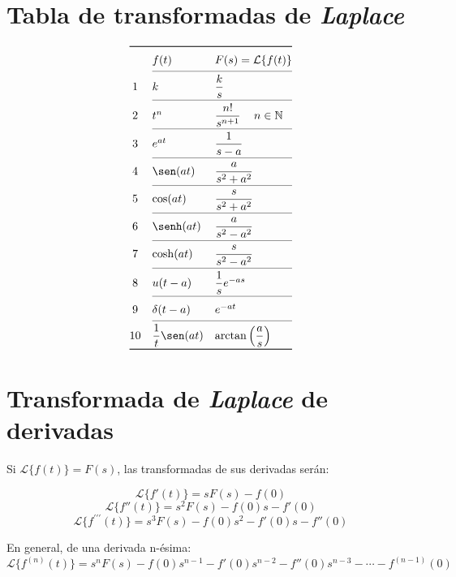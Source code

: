 \section{Tabla de transformadas de \emph{Laplace}}

\begin{equation*}
\def\arraystretch{1.4}
\begin{array}{@{}cll@{}}
\toprule
 & f(t) & F(s)=\mathcal{L}\{f(t)\}\\
\cmidrule(l){2-3}
 1 & k
   & \dfrac{k}{s}\\
\cmidrule(l){2-3}
 2 & t^n
   & \dfrac{n!}{s^{n+1}}\quad\,n\in\mathbb{N}\\
\cmidrule(l){2-3}
 3 & e^{at}
   & \dfrac{1}{s-a}\\
\cmidrule(l){2-3}
 4 & \sen(at)
   & \dfrac{a}{s^2+a^2}\\
\cmidrule(l){2-3}
 5 & \cos(at)
   & \dfrac{s}{s^2+a^2}\\
\cmidrule(l){2-3}
 6 & \senh(at)
   & \dfrac{a}{s^2-a^2}\\
\cmidrule(l){2-3}
 7 & \cosh(at)
   & \dfrac{s}{s^2-a^2}\\
\cmidrule(l){2-3}
 8 & u(t-a)
   & \dfrac{1}{s}e^{-as}\\
\cmidrule(l){2-3}
 9 & \delta(t-a)
   & e^{-at}\\
\cmidrule(l){2-3}
10 & \dfrac{1}{t}\sen(at)
   & \arctan\left(\dfrac{a}{s}\right)\\
\bottomrule
\end{array}
\end{equation*}

\section{Transformada de \emph{Laplace} de derivadas}
Si $\mathcal{L}\{f(t)\}=F(s)$, las transformadas de sus derivadas serán:

\begin{equation}
    \mathcal{L}\{f'(t)\}=sF(s)-f(0)
\end{equation}
\begin{equation}
    \mathcal{L}\{f''(t)\}=s^2F(s)-f(0)s-f'(0)
\end{equation}
\begin{equation}
    \mathcal{L}\{f^{\prime\prime\prime}(t)\}=s^3F(s)-f(0)s^2-f'(0)s-f''(0)
\end{equation}

En general, de una derivada n-ésima:
\begin{equation}
    \mathcal{L}\{f^{(n)}(t)\}=s^{n}F(s)-f(0)s^{n-1}-f'(0)s^{n-2}-f''(0)s^{n-3}
    -\cdots-f^{(n-1)}(0)
\end{equation}

